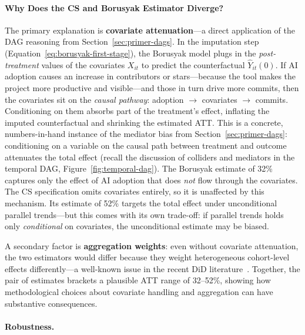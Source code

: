 \paragraph{Why Does the CS and Borusyak Estimator Diverge?}

The primary explanation is \textbf{covariate attenuation}---a direct application of the DAG reasoning from Section~\ref{sec:primer-dags}.
In the imputation step (Equation~\ref{eq:borusyak-first-stage}), the Borusyak model plugs in the \emph{post-treatment} values of the covariates $X_{it}$ to predict the counterfactual $\hat{Y}_{it}(0)$.
If AI adoption causes an increase in contributors or stars---because the tool makes the project more productive and visible---and those in turn drive more commits, then the covariates sit on the \emph{causal pathway}: adoption $\to$ covariates $\to$ commits.
Conditioning on them absorbs part of the treatment's effect, inflating the imputed counterfactual and shrinking the estimated ATT\@.
This is a concrete, numbers-in-hand instance of the mediator bias from Section~\ref{sec:primer-dags}: conditioning on a variable on the causal path between treatment and outcome attenuates the total effect (recall the discussion of colliders and mediators in the temporal DAG, Figure~\ref{fig:temporal-dag}).
The Borusyak estimate of 32\% captures only the effect of AI adoption that does \emph{not} flow through the covariates.
The CS specification omits covariates entirely, so it is unaffected by this mechanism.
Its estimate of 52\% targets the total effect under unconditional parallel trends---but this comes with its own trade-off: if parallel trends holds only \emph{conditional} on covariates, the unconditional estimate may be biased.

A secondary factor is \textbf{aggregation weights}: even without covariate attenuation, the two estimators would differ because they weight heterogeneous cohort-level effects differently---a well-known issue in the recent DiD literature~\cite{roth2023whats}.
Together, the pair of estimates brackets a plausible ATT range of 32--52\%, showing how methodological choices about covariate handling and aggregation can have substantive consequences.

\paragraph{Robustness.}
\label{sec:robustness}

